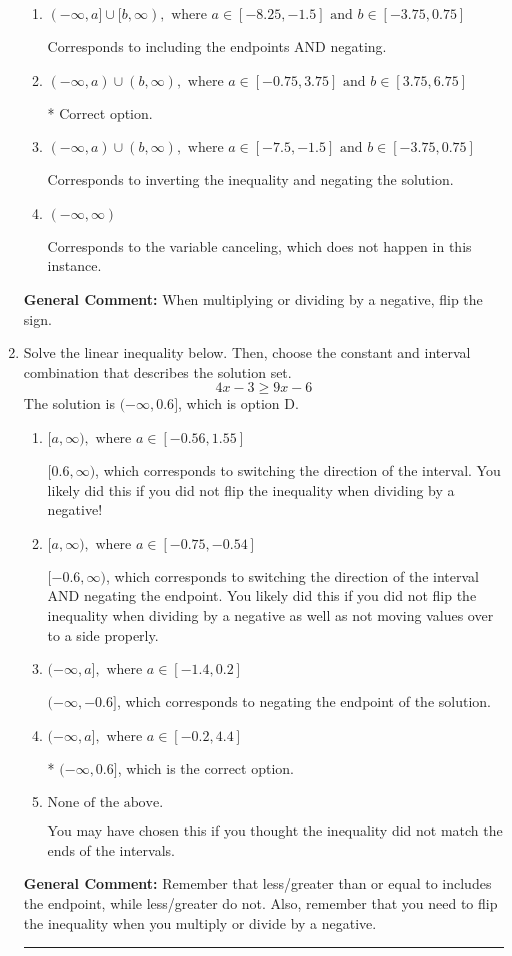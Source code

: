 \documentclass{extbook}[14pt]
\newcommand{\litem}[1]{\item #1

\rule{\textwidth}{0.4pt}}
\begin{document}
\begin{enumerate}
{\begin{enumerate}[label=\Alph*.]
Corresponds to including the endpoints (when they should be excluded).
\item \( (-\infty, a] \cup [b, \infty), \text{ where } a \in [-8.25, -1.5] \text{ and } b \in [-3.75, 0.75] \)

Corresponds to including the endpoints AND negating.
\item \( (-\infty, a) \cup (b, \infty), \text{ where } a \in [-0.75, 3.75] \text{ and } b \in [3.75, 6.75] \)

 * Correct option.
\item \( (-\infty, a) \cup (b, \infty), \text{ where } a \in [-7.5, -1.5] \text{ and } b \in [-3.75, 0.75] \)

Corresponds to inverting the inequality and negating the solution.
\item \( (-\infty, \infty) \)

Corresponds to the variable canceling, which does not happen in this instance.
\end{enumerate}

\textbf{General Comment:} When multiplying or dividing by a negative, flip the sign.
}
\litem{
Solve the linear inequality below. Then, choose the constant and interval combination that describes the solution set.
\[ 4x -3 \geq 9x -6 \]The solution is \( (-\infty, 0.6] \), which is option D.\begin{enumerate}[label=\Alph*.]
\item \( [a, \infty), \text{ where } a \in [-0.56, 1.55] \)

 $[0.6, \infty)$, which corresponds to switching the direction of the interval. You likely did this if you did not flip the inequality when dividing by a negative!
\item \( [a, \infty), \text{ where } a \in [-0.75, -0.54] \)

 $[-0.6, \infty)$, which corresponds to switching the direction of the interval AND negating the endpoint. You likely did this if you did not flip the inequality when dividing by a negative as well as not moving values over to a side properly.
\item \( (-\infty, a], \text{ where } a \in [-1.4, 0.2] \)

 $(-\infty, -0.6]$, which corresponds to negating the endpoint of the solution.
\item \( (-\infty, a], \text{ where } a \in [-0.2, 4.4] \)

* $(-\infty, 0.6]$, which is the correct option.
\item \( \text{None of the above}. \)

You may have chosen this if you thought the inequality did not match the ends of the intervals.
\end{enumerate}

\textbf{General Comment:} Remember that less/greater than or equal to includes the endpoint, while less/greater do not. Also, remember that you need to flip the inequality when you multiply or divide by a negative.
}
\end{enumerate}
\end{document}

